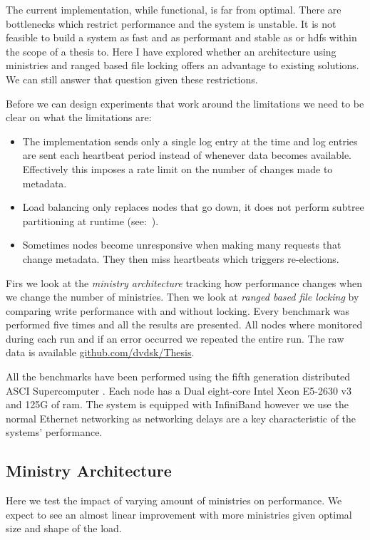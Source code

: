 The current implementation, while functional, is far from optimal. There are bottlenecks which restrict performance and the system is unstable. It is not feasible to build a system as fast and as performant and stable as \ceph{} or \ac{hdfs} within the scope of a thesis to. Here I have explored whether an architecture using ministries and ranged based file locking offers an advantage to existing solutions. We can still answer that question given these restrictions. 

Before we can design experiments that work around the limitations we need to be clear on what the limitations are:

\begin{itemize}
	\item The \raft{} implementation sends only a single log entry at the time and log entries are sent each heartbeat period instead of whenever data becomes available. Effectively this imposes a rate limit on the number of changes made to metadata.
	\item Load balancing only replaces nodes that go down, it does not perform subtree partitioning at runtime (see:~).
	\item Sometimes nodes become unresponsive when making many requests that change metadata. They then miss heartbeats which triggers re-elections.
\end{itemize}

Firs we look at the \textit{ministry architecture} tracking how performance changes when we change the number of ministries. Then we look at \textit{ranged based file locking} by comparing write performance with and without locking. Every benchmark was performed five times and all the results are presented. All nodes where monitored during each run and if an error occurred we repeated the entire run. The raw data is available \href{https://github.com/dvdsk/Thesis}{github.com/dvdsk/Thesis}.

All the benchmarks have been performed using the fifth generation distributed ASCI Supercomputer \cite{das5}. Each node has a Dual eight-core Intel Xeon E5-2630 v3 and 125G of ram. The system is equipped with InfiniBand however we use the normal Ethernet networking as networking delays are a key characteristic of the systems' performance.

\subsection{Ministry Architecture}
Here we test the impact of varying amount of ministries on performance. We expect to see an almost linear improvement with more ministries given optimal size and shape of the load.


